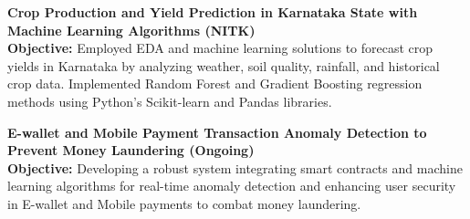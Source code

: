\documentclass[a4paper,10pt]{article}
\begin{document}
    \textbf{Crop Production and Yield Prediction in Karnataka State with Machine Learning Algorithms (NITK)}\\
    \textbf{Objective:} Employed EDA and machine learning solutions to forecast crop yields in Karnataka by analyzing weather, soil quality, rainfall, and historical crop data. Implemented Random Forest and Gradient Boosting regression methods using Python's Scikit-learn and Pandas libraries. 
    
    \textbf{E-wallet and Mobile Payment Transaction Anomaly Detection to Prevent Money Laundering (Ongoing)}\\
    \textbf{Objective:} Developing a robust system integrating smart contracts and machine learning algorithms for real-time anomaly detection and enhancing user security in E-wallet and Mobile payments to combat money laundering.
\end{document}
